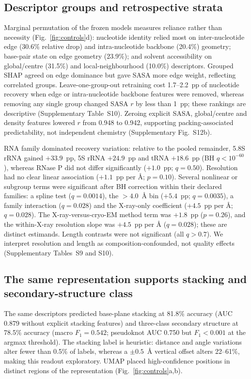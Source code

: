 \subsection{Descriptor groups and retrospective strata}
\label{sec:feature_strata}

Marginal permutation of the frozen models measures reliance rather than necessity (Fig.~\ref{fig:controls}d): nucleotide identity relied most on inter-nucleotide edge
(30.6\% relative drop) and intra-nucleotide backbone (20.4\%) geometry; base-pair state on edge geometry (23.9\%);
and solvent accessibility on global/centre (31.5\%) and local-neighbourhood
(10.0\%) descriptors. Grouped SHAP agreed on edge dominance but gave SASA more edge weight, reflecting correlated groups. Leave-one-group-out retraining cost 1.7--2.2~pp of nucleotide recovery when edge
or intra-nucleotide backbone features were removed, whereas removing any single group changed SASA $r$ by less than
1~pp; these rankings are descriptive (Supplementary Table~S10). Zeroing explicit SASA, global/centre and density features lowered $r$ from
0.948 to 0.942, supporting packing-associated predictability, not independent chemistry (Supplementary Fig.~S12b). 

RNA family dominated recovery variation: relative to the pooled remainder,
5.8S rRNA gained $+33.9$~pp, 5S rRNA $+24.9$~pp and tRNA $+18.6$~pp (BH
$q<10^{-60}$), whereas RNase P did not differ significantly ($+1.0$~pp; $q=0.50$). Resolution had no
clear linear association ($+1.1$~pp per \AA{}; $p=0.10$).
Several nonlinear or subgroup terms were significant after BH correction within their
declared families: a spline test ($q=0.0014$), the $>4.0$~\AA{} bin ($+5.4$~pp;
$q=0.0035$), a family interaction ($q=0.028$) and the X-ray-only coefficient
($+4.5$~pp per \AA{}; $q=0.028$). The X-ray-versus-cryo-EM method term was $+1.8$~pp
($p=0.26$), and the within-X-ray resolution slope was $+4.5$~pp per \AA{}
($q=0.028$); these are distinct estimands. Length contrasts were not significant
(all $q>0.7$). We interpret resolution and length as composition-confounded,
not quality effects (Supplementary Tables~S9 and S10).

\subsection{The same representation supports stacking and secondary-structure class}

The same descriptors predicted base-plane stacking at 81.8\% accuracy (AUC 0.879
without explicit stacking features) and three-class secondary structure at 78.5\% accuracy (macro $F_1=0.542$;
pseudoknot AUC 0.750 but $F_1<0.001$ at the argmax threshold). The stacking label is
heuristic: distance and angle variations alter fewer than 0.5\% of labels, whereas a $\pm0.5$~\AA{}
vertical offset alters 22--61\%, making this readout exploratory. UMAP placed high-confidence positions in distinct regions of the representation
(Fig.~\ref{fig:controls}a,b). 


